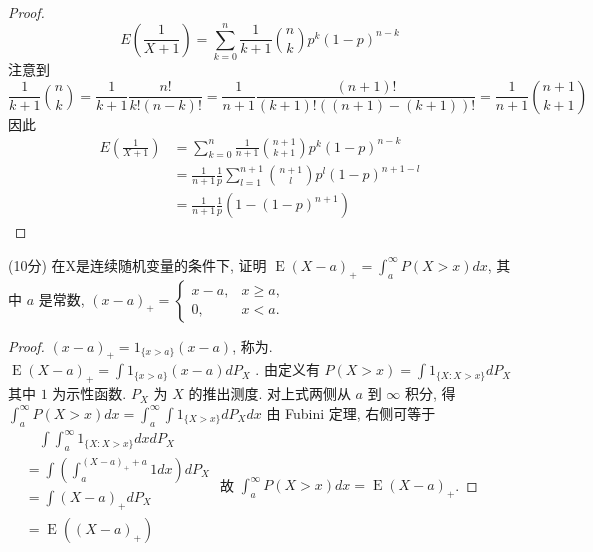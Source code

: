 \documentclass[../main.tex]{subfiles}
\begin{document}
\begin{proof}
    \[
    E\left( \frac{1 }{X+ 1 }  \right)=  \sum _{k = 0}^{n}\frac{1 }{k+ 1 }\binom{ n }{k  }   p^{k}\left( 1-p \right)^{n-k} 
    \]注意到 \[
    \frac{1 }{k+ 1 }\binom{ n }{k  }= \frac{1 }{k+ 1 }\frac{n! }{k!\left( n-k \right)!  }= \frac{1 }{n+ 1 }\frac{\left( n+ 1 \right)!  }{\left( k+ 1 \right)! \left( \left( n+ 1 \right)-\left( k+ 1 \right)   \right)!   }= \frac{1 }{n+ 1 }\binom{ n+ 1 }{k+ 1  }        
    \]因此 \[
   \begin{aligned}
    E\left( \frac{1 }{X+ 1 }  \right)&= \sum _{k = 0}^{n}\frac{1 }{n+ 1 }\binom{ n+ 1 }{k+ 1  }p^{k}\left( 1-p \right)^{n-k}    \\ 
     &= \frac{1 }{n+ 1 } \frac{1}{p } \sum _{l = 1}^{n+ 1} \binom{ n+ 1 }{l  }p^{l} \left( 1-p \right)^{n+ 1-l} \\ 
      &= \frac{1 }{n+ 1 }\frac{1 }{p }\left( 1- \left( 1-p \right)^{n+ 1}  \right) 
   \end{aligned}
    \]
\end{proof}

(10分) 在X是连续随机变量的条件下, 证明 $\operatorname{E}(X-a)_+ = \int_a^\infty P(X > x) dx$, 其中 $a$ 是常数,
$(x-a)_+ = \begin{cases} x-a, & x \ge a, \\ 0, & x < a. \end{cases}$
\begin{proof}
$(x-a)_+ = 1_{\{x>a\}}(x-a)$, 称为.
$\operatorname{E}(X-a)_+ = \int 1_{\{x>a\}}(x-a) dP_X$
.
由定义有
$P(X>x) = \int 1_{\{X: X>x\}} dP_X$
其中 $1$ 为示性函数. $P_X$ 为 $X$ 的推出测度.
对上式两侧从 $a$ 到 $\infty$ 积分, 得
$\int_a^\infty P(X>x) dx = \int_a^\infty \int 1_{\{X>x\}} dP_X dx$
由 Fubini 定理, 右侧可等于
$\begin{aligned} & \quad \int \int_a^\infty 1_{\{X:X>x\}} dx dP_X \\ &= \int \left( \int_a^{\left( X-a \right)_{+ }+ a } 1 dx \right) dP_X \\ &= \int (X-a)_+ dP_X \\ &= \operatorname{E}((X-a)_+) \end{aligned}$
故 $\int_a^\infty P(X>x) dx = \operatorname{E}(X-a)_+$.
\end{proof}
\end{document}
